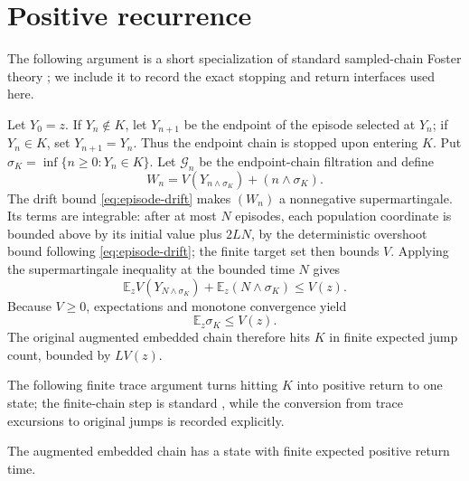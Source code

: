 \section{Positive recurrence}\label{sec:recurrence}

The following argument is a short specialization of standard sampled-chain
Foster theory \citep{MeynTweedie2009}; we include it to record the exact
stopping and return interfaces used here.

Let \(Y_0=z\).  If \(Y_n\notin K\), let \(Y_{n+1}\) be the endpoint of the
episode selected at \(Y_n\); if \(Y_n\in K\), set \(Y_{n+1}=Y_n\).  Thus the
endpoint chain is stopped upon entering \(K\).  Put
\(
 \sigma_K=\inf\{n\ge0:Y_n\in K\}.
\)
Let \(\mathcal G_n\) be the endpoint-chain filtration and define
\[
 W_n=V(Y_{n\wedge\sigma_K})+(n\wedge\sigma_K).
\]
The drift bound \eqref{eq:episode-drift} makes \((W_n)\) a nonnegative
supermartingale.  Its terms are integrable: after at most \(N\) episodes, each
population coordinate is bounded above by its initial value plus \(2LN\), by
the deterministic overshoot bound following \eqref{eq:episode-drift}; the
finite target set then bounds \(V\).  Applying the supermartingale inequality
at the bounded time \(N\) gives
\begin{equation}\label{eq:stopped-drift}
  \mathbb E_zV(Y_{N\wedge\sigma_K})
  +\mathbb E_z(N\wedge\sigma_K)
  \le V(z).
\end{equation}
Because \(V\ge0\), expectations and monotone convergence yield
\begin{equation}\label{eq:episodes-to-K}
  \mathbb E_z\sigma_K\le V(z).
\end{equation}
The original augmented embedded chain therefore hits \(K\) in finite
expected jump count, bounded by \(L V(z)\).

The following finite trace argument turns hitting \(K\) into positive return
to one state; the finite-chain step is standard \citep{Norris1997}, while the
conversion from trace excursions to original jumps is recorded explicitly.

\begin{proposition}\label{prop:trace}
The augmented embedded chain has a state with finite expected positive return
time.
\end{proposition}

